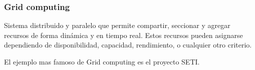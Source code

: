 \subsubsection{Grid computing}
Sistema distribuido y paralelo que permite compartir, seccionar y agregar recursos de forma dinámica y en tiempo real. Estos recursos pueden asignarse dependiendo de disponibilidad, capacidad, rendimiento, o cualquier otro criterio.

El ejemplo mas famoso de Grid computing es el proyecto SETI.